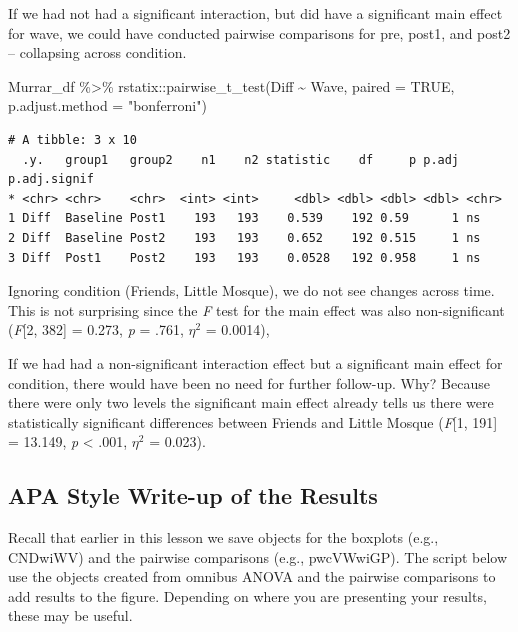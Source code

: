 \documentclass[
  11pt,
]{book}
\newenvironment{Shaded}{\begin{snugshade}}{\end{snugshade}}
\newcommand{\AttributeTok}[1]{\textcolor[rgb]{0.77,0.63,0.00}{#1}}
\newcommand{\ConstantTok}[1]{\textcolor[rgb]{0.00,0.00,0.00}{#1}}
\newcommand{\FunctionTok}[1]{\textcolor[rgb]{0.00,0.00,0.00}{#1}}
\newcommand{\NormalTok}[1]{#1}
\newcommand{\SpecialCharTok}[1]{\textcolor[rgb]{0.00,0.00,0.00}{#1}}
\newcommand{\StringTok}[1]{\textcolor[rgb]{0.31,0.60,0.02}{#1}}
\begin{document}
If we had not had a significant interaction, but did have a significant main effect for wave, we could have conducted pairwise comparisons for pre, post1, and post2 -- collapsing across condition.

\begin{Shaded}
\begin{Highlighting}[]
\NormalTok{Murrar\_df }\SpecialCharTok{\%\textgreater{}\%}
\NormalTok{    rstatix}\SpecialCharTok{::}\FunctionTok{pairwise\_t\_test}\NormalTok{(Diff }\SpecialCharTok{\textasciitilde{}}\NormalTok{ Wave, }\AttributeTok{paired =} \ConstantTok{TRUE}\NormalTok{, }\AttributeTok{p.adjust.method =} \StringTok{"bonferroni"}\NormalTok{)}
\end{Highlighting}
\end{Shaded}

\begin{verbatim}
# A tibble: 3 x 10
  .y.   group1   group2    n1    n2 statistic    df     p p.adj p.adj.signif
* <chr> <chr>    <chr>  <int> <int>     <dbl> <dbl> <dbl> <dbl> <chr>       
1 Diff  Baseline Post1    193   193    0.539    192 0.59      1 ns          
2 Diff  Baseline Post2    193   193    0.652    192 0.515     1 ns          
3 Diff  Post1    Post2    193   193    0.0528   192 0.958     1 ns          
\end{verbatim}

Ignoring condition (Friends, Little Mosque), we do not see changes across time. This is not surprising since the \emph{F} test for the main effect was also non-significant (\emph{F}{[}2, 382{]} = 0.273, \emph{p} = .761, \(\eta^{2}\) = 0.0014),

If we had had a non-significant interaction effect but a significant main effect for condition, there would have been no need for further follow-up. Why? Because there were only two levels the significant main effect already tells us there were statistically significant differences between Friends and Little Mosque (\emph{F}{[}1, 191{]} = 13.149, \emph{p} \textless{} .001, \(\eta^{2}\) = 0.023).

\hypertarget{apa-style-write-up-of-the-results}{%
\subsection{APA Style Write-up of the Results}\label{apa-style-write-up-of-the-results}}

Recall that earlier in this lesson we save objects for the boxplots (e.g., CNDwiWV) and the pairwise comparisons (e.g., pwcVWwiGP). The script below use the objects created from omnibus ANOVA and the pairwise comparisons to add results to the figure. Depending on where you are presenting your results, these may be useful.
\end{document}
